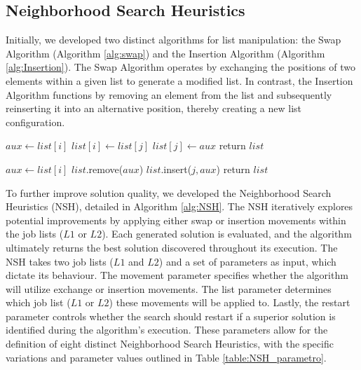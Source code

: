 \documentclass{article}
\begin{document}
\subsection{Neighborhood Search Heuristics } %
\label{subsec:NeighborhoodSearchHeuristics }

Initially, we developed two distinct algorithms for list manipulation: the Swap Algorithm (Algorithm \ref{alg:swap}) and the Insertion Algorithm (Algorithm \ref{alg:Insertion}). The Swap Algorithm operates by exchanging the positions of two elements within a given list to generate a modified list. In contrast, the Insertion Algorithm functions by removing an element from the list and subsequently reinserting it into an alternative position, thereby creating a new list configuration.

\begin{algorithm}[H]
\caption{Swap Algorithm.\label{alg:swap}}
\begin{algorithmic}[1]
    \State $aux \leftarrow list[i]$
    \State $list[i] \leftarrow list[j]$
    \State $list[j] \leftarrow aux$
    \State return $list$
\EndFunction
\end{algorithmic}
\end{algorithm}

\begin{algorithm}[H]
\caption{Insertion Algorithm.\label{alg:Insertion}}
\begin{algorithmic}[1]
    \State $aux \leftarrow list[i]$
    \State $list$.remove($aux$)
    \State $list$.insert($j, aux$)
    \State return $list$
\EndFunction
\end{algorithmic}
\end{algorithm}

To further improve solution quality, we developed the Neighborhood Search Heuristics (NSH), detailed in Algorithm \ref{alg:NSH}. The NSH iteratively explores potential improvements by applying either swap or insertion movements within the job lists ($L1$ or $L2$). Each generated solution is evaluated, and the algorithm ultimately returns the best solution discovered throughout its execution. The NSH takes two job lists ($L1$ and $L2$) and a set of parameters as input, which dictate its behaviour. The movement parameter specifies whether the algorithm will utilize exchange or insertion movements. The list parameter determines which job list ($L1$ or $L2$) these movements will be applied to. Lastly, the restart parameter controls whether the search should restart if a superior solution is identified during the algorithm's execution. These parameters allow for the definition of eight distinct Neighborhood Search Heuristics, with the specific variations and parameter values outlined in Table \ref{table:NSH_parametro}.
\end{document}
